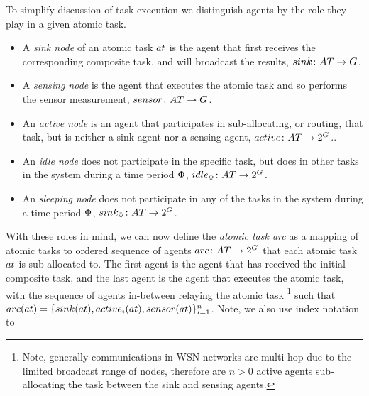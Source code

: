 To simplify discussion of task execution we distinguish agents by the role they play in a given atomic task.
\begin{itemize}
	\item A \textit{sink node} of an atomic task $\varAtomicTask{}{}$ is the agent that first receives the corresponding composite task, and will broadcast the results, $\formalSinkRole{}{}$.
	\item A \textit{sensing node} is the agent that executes the atomic task and so performs the sensor measurement, $\formalSenseRole{}{}$.
	\item An \textit{active node} is an agent that participates in sub-allocating, or routing, that task, but is neither a sink agent nor a sensing agent, $\formalActiveRole{}{}$..
	\item An \textit{idle node} does not participate in the specific task, but does in other tasks in the system during a time period $\Phi$, $\formalIdleRole{}{}$.
	\item An \textit{sleeping node} does not participate in any of the tasks in the system during a time period $\Phi$, $\formalSleepRole{}{}$.
\end{itemize}
With these roles in mind, we can now define the  \textit{atomic task arc} as a mapping of atomic tasks to ordered sequence of agents $\formalTaskArc{}{}$ that each atomic task $\varAtomicTask{}{}$ is sub-allocated to. The first agent is the agent that has received the initial composite task, and the last agent is the agent that executes the atomic task, with the sequence of agents in-between relaying the atomic task \footnote{Note, generally communications in WSN networks are multi-hop due to the limited broadcast range of nodes, therefore are $n>0$ active agents sub-allocating the task between the sink and sensing agents.} such that 
$\functionTaskArc{}{} = \lbrace \functionSinkRole{}{}, \functionActiveRole{i}{}, \functionSenseRole{}{} \rbrace_{i=1}^{n}$. Note, we also use index notation to 

